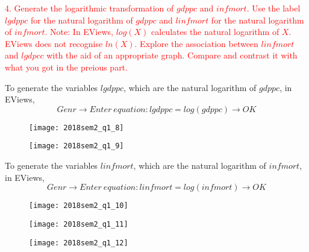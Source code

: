 \documentclass[12pt]{report}
\begin{document}
\newpage
\noindent \textcolor{red}{4. Generate the logarithmic transformation of $gdppc$ and $infmort$. Use the label $lgdppc$ for the natural logarithm of $gdppc$ and $linfmort$ for the natural logarithm of $infmort$. Note: In EViews, $log(X)$ calculates the natural logarithm of $X$. EViews does not recognise $ln(X)$. Explore the association between $linfmort$ and $lgdpcc$ with the aid of an appropriate graph. Compare and contrast it with what you got in the preious part.}

\noindent To generate the variables $lgdppc$, which are the natural logarithm of $gdppc$, in EViews,
$$Genr \to Enter\ equation:lgdppc = log(gdppc) \to OK$$
\begin{figure}[H]
	\centerline{\texttt{[image: 2018sem2\_q1\_8]}}
\end{figure}
\vspace{-\baselineskip}
\begin{figure}[H]
	\centerline{\texttt{[image: 2018sem2\_q1\_9]}}
\end{figure}
\vspace{-\baselineskip} \noindent To generate the variables $linfmort$, which are the natural logarithm of  $infmort$, in EViews,
$$Genr \to Enter\ equation:linfmort = log(infmort) \to OK$$
\begin{figure}[H]
	\centerline{\texttt{[image: 2018sem2\_q1\_10]}}
\end{figure}
\vspace{-\baselineskip}
\begin{figure}[H]
	\centerline{\texttt{[image: 2018sem2\_q1\_11]}}
\end{figure}
\vspace{-\baselineskip}
\begin{figure}[H]
	\centerline{\texttt{[image: 2018sem2\_q1\_12]}}
\end{figure}
\vspace{-\baselineskip}
\end{document}
